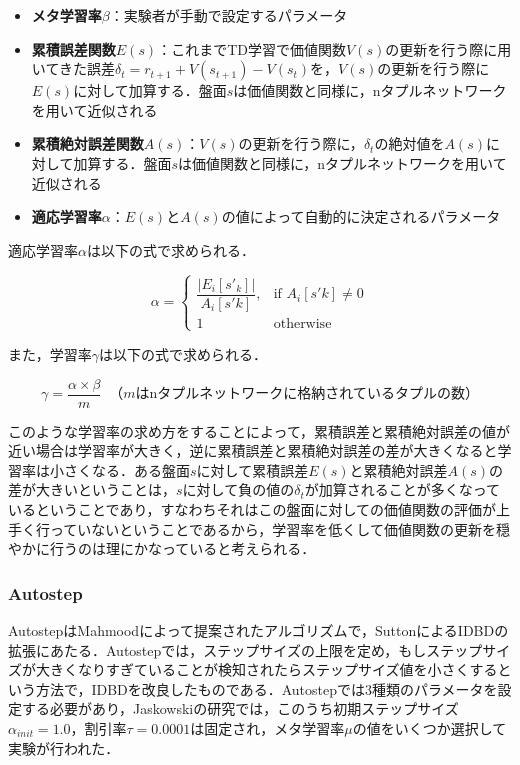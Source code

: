 \documentclass{suribt}
\begin{document}
\begin{itemize}
\item \textbf{メタ学習率${\beta}$}：実験者が手動で設定するパラメータ
\item \textbf{累積誤差関数$E(s)$}：これまでTD学習で価値関数$V(s)$の更新を行う際に用いてきた誤差${\delta}_t = r_{t+1} + V(s_{t+1}) - V(s_t)$を，$V(s)$の更新を行う際に$E(s)$に対して加算する．盤面$s$は価値関数と同様に，nタプルネットワークを用いて近似される
\item \textbf{累積絶対誤差関数$A(s)$}：$V(s)$の更新を行う際に，${\delta}_t$の絶対値を$A(s)$に対して加算する．盤面$s$は価値関数と同様に，nタプルネットワークを用いて近似される
\item \textbf{適応学習率${\alpha}$}：$E(s)$と$A(s)$の値によって自動的に決定されるパラメータ
\end{itemize}

適応学習率${\alpha}$は以下の式で求められる．

\[
{\alpha} = 
\begin{cases}
\dfrac{|E_i[s'_k]|}{A_i[s'k]}, & \text{if $A_i[s'k] \neq 0$} \\
1 & \text{otherwise}
\end{cases}
\]

また，学習率${\gamma}$は以下の式で求められる．

\[
{\gamma} = \dfrac{{\alpha} \times {\beta}}{m} \;\; \text{（$m$はnタプルネットワークに格納されているタプルの数）}
\]

このような学習率の求め方をすることによって，累積誤差と累積絶対誤差の値が近い場合は学習率が大きく，逆に累積誤差と累積絶対誤差の差が大きくなると学習率は小さくなる．ある盤面$s$に対して累積誤差$E(s)$と累積絶対誤差$A(s)$の差が大きいということは，$s$に対して負の値の${\delta}_t$が加算されることが多くなっているということであり，すなわちそれはこの盤面に対しての価値関数の評価が上手く行っていないということであるから，学習率を低くして価値関数の更新を穏やかに行うのは理にかなっていると考えられる．

\subsubsection{Autostep}
AutostepはMahmoodによって提案されたアルゴリズムで，SuttonによるIDBDの拡張にあたる．Autostepでは，ステップサイズの上限を定め，もしステップサイズが大きくなりすぎていることが検知されたらステップサイズ値を小さくするという方法で，IDBDを改良したものである．Autostepでは3種類のパラメータを設定する必要があり，Jaskowskiの研究では，このうち初期ステップサイズ${\alpha}_{init} = 1.0$，割引率${\tau} = 0.0001$は固定され，メタ学習率${\mu}$の値をいくつか選択して実験が行われた．
\end{document}
